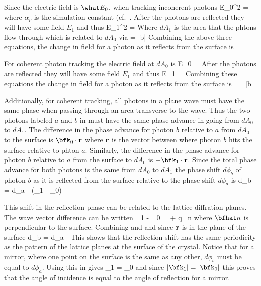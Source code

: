 Since the electric field is $\what E_0$, when tracking incoherent photons
\Begineq
  \what E_0^2 = 
\Endeq
where $\alpha_p$ is the simulation constant (cf.~. 
After the photons are reflected they will have some field $E_1$ and thus
\Begineq
  \what E_1^2 = 
\Endeq
Where $dA_1$ is the area that the phtons flow through which is related
to $dA_0$ via
\Begineq
   = \frac{\bfk_1 \cdot \bfz}{\bfk_0 \cdot \bfz} \equiv |b|
\Endeq
Combining the above three equations, the change in field for a photon
as it reflects from the surface is
\Begineq
   =  \,  
  \qquad {}
\Endeq

For coherent photon tracking the electric field at $dA_0$ is
\Begineq
  \what E_0 = 
\Endeq
After the photons are reflected they will have some field $E_1$ and thus
\Begineq
  \what E_1 = 
\Endeq
Combining these equations the change in field for a photon
as it reflects from the surface is
\Begineq
   =  \, |b| 
  \qquad {}
\Endeq

Additionally, for coherent tracking, all photons in a plane wave must
have the same phase when passing through an area transverse to the
wave. Thus the two photons labeled $a$ and $b$ in
 must have the same phase advance in going from
$dA_0$ to $dA_1$. The difference in the phase advance for photon $b$
relative to $a$ from $dA_0$ to the surface is $\bfk_0 \cdot \bfr$
where ${\bf r}$ is the vector between where photon $b$ hits the surface
relative to phton $a$. Similarly, the difference in the phase advance
for photon $b$ relative to $a$ from the surface to $dA_0$ is $-\bfk_1
\cdot \bfr$. Since the total phase advance for both photons is the
same from $dA_0$ to $dA_1$ the phase shift $d\phi_b$ of photon $b$ as
it is reflected from the surface relative to the phase shift $d\phi_a$
is
\Begineq
  d\phi_b = d\phi_a - (\bfk_1 - \bfk_0) \cdot \bfr
  \label{dpbdpa}
\Endeq

This shift in the reflection phase can be related to the lattice
diffration planes. The wave vector difference can be written
\Begineq
  \bfk_1 - \bfk_0 = \bfH + q \, \bfhat n
  \label{k1k0}
\Endeq
where $\bfhat n$ is perpendicular to the surface. Combining
 and  and since ${\bf r}$ is in
the plane of the surface
\Begineq
  d\phi_b = d\phi_a - \bfH \cdot \bfr
\Endeq
This shows that the reflection shift has the same periodicity as the
pattern of the lattice planes at the surface of the crystal. Notice
that for a mirror, where one point on the surface is the same as any
other, $d\phi_b$ must be equal to $d\phi_a$. Using this in 
gives 
\Begineq
  \bfk_1 \cdot \bfr = \bfk_0 \cdot \bfr
\Endeq
and since $|\bfk_1| = |\bfk_0|$ this proves that the angle of
incidence is equal to the angle of reflection for a mirror.

